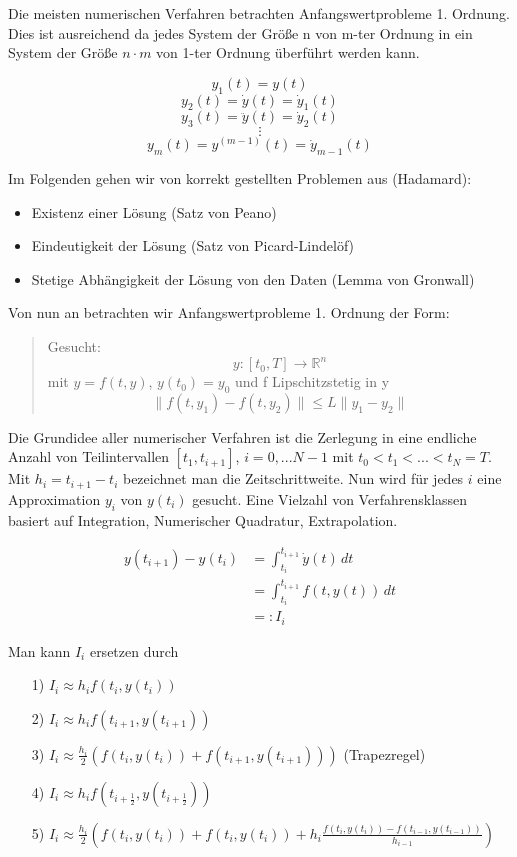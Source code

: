 Die meisten numerischen Verfahren betrachten Anfangswertprobleme 1. Ordnung. Dies ist ausreichend da jedes System der Größe n von m-ter Ordnung in ein System der Größe $n \cdot m$ von 1-ter Ordnung überführt werden kann.

$$y_1(t) = y(t)$$
$$y_2(t) = \dot{y}(t) = \dot{y}_1(t)$$
$$y_3(t) = \ddot{y}(t) = \dot{y}_2(t)$$
$$\vdots$$
$$y_m(t) = y^{(m-1)}(t) = \dot{y}_{m-1}(t)$$

Im Folgenden gehen wir von korrekt gestellten Problemen aus (Hadamard):

\begin{itemize}
	\item Existenz einer Lösung (Satz von Peano)
	\item Eindeutigkeit der Lösung (Satz von Picard-Lindelöf)
	\item Stetige Abhängigkeit der Lösung von den Daten (Lemma von Gronwall)
\end{itemize}

Von nun an betrachten wir Anfangswertprobleme 1. Ordnung der Form:

\begin{quote}
	Gesucht: 
	$$y: [t_0, T] \rightarrow \mathbb{R}^n$$ mit 
	$y = f(t, y)$, $y(t_0) = y_0$ und f Lipschitzstetig in y
	$$\|f(t,y_1) - f(t,y_2)\| \le L \|y_1 - y_2\|$$
\end{quote}

Die Grundidee aller numerischer Verfahren ist die Zerlegung in eine endliche Anzahl von Teilintervallen $[t_1, t_{i+1}]$, $i = 0, ... N-1$ mit $t_0 < t_1 < ... < t_N = T$. Mit $h_i = t_{i+1} - t_i$ bezeichnet man die Zeitschrittweite. Nun wird für jedes $i$ eine Approximation $y_i$ von $y(t_i)$ gesucht. Eine Vielzahl von Verfahrensklassen basiert auf Integration, Numerischer Quadratur, Extrapolation.

\begin{align}
	\nonumber y(t_{i+1}) - y(t_i) &= \int_{t_i}^{t_{i+1}}\!\dot{y}(t)\,dt \\
	\nonumber &= \int_{t_i}^{t_{i+1}}\!f(t, y(t))\,dt \\
	\nonumber &=: I_i
\end{align}

Man kann $I_i$ ersetzen durch

\begin{enumerate}
	\item[1)] $I_i \approx h_i f(t_i, y(t_i))$ 
	\item[2)] $I_i \approx h_i f(t_{i+1}, y(t_{i+1}))$ 
	\item[3)] $I_i \approx \frac{h_i}{2} (f(t_i, y(t_i)) + f(t_{i+1}, y(t_{i+1})))$ (Trapezregel)
	\item[4)] $I_i \approx h_i f(t_{i+\frac{1}{2}}, y(t_{i+\frac{1}{2}}))$
	\item[5)] $I_i \approx \frac{h_i}{2} (f(t_i, y(t_i)) + f(t_i, y(t_i)) + h_i \frac {f(t_i,y(t_i))-f(t_{i-1}, y(t_{i-1}))}{h_{i-1}})$
\end{enumerate}

